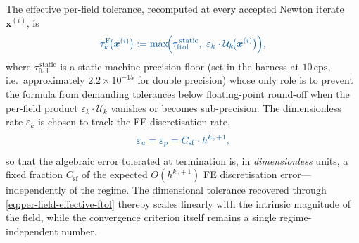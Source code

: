 \documentclass{article}
\newcommand{\textftol}{\tau_{\mathrm{ftol}}}
\newcommand{\extline}[1]{{\color{extcolor}#1}}
\begin{document}
\extline{The effective per-field tolerance, recomputed at every
accepted Newton iterate $\boldsymbol{x}^{(i)}$, is}
\begin{equation}
    \label{eq:per-field-effective-ftol}
    \textcolor{extcolor}{
    \tau^{\mathrm{F}}_{k}\!\bigl(\boldsymbol{x}^{(i)}\bigr)
    := \max\!\Bigl(\textftol^{\,\mathrm{static}},\
        \varepsilon_{k} \cdot \mathcal{U}_{k}\!\bigl(\boldsymbol{x}^{(i)}\bigr)\Bigr),}
\end{equation}
\extline{where $\textftol^{\,\mathrm{static}}$ is a static
machine-precision floor (set in the harness at $10\,\mathrm{eps}$,
i.e.\ approximately $2.2\times 10^{-15}$ for double precision) whose
only role is to prevent the formula from demanding tolerances below
floating-point round-off when the per-field product
$\varepsilon_{k}\cdot \mathcal{U}_{k}$ vanishes or becomes
sub-precision. The dimensionless rate $\varepsilon_{k}$ is chosen to track
the FE discretisation rate,}
\begin{equation}
    \label{eq:per-field-rate}
    \textcolor{extcolor}{
    \varepsilon_{u} = \varepsilon_{p} = C_{\mathrm{sf}} \cdot h^{k_{v}+1},}
\end{equation}
\extline{so that the algebraic error tolerated at termination is, in
\emph{dimensionless} units, a fixed fraction $C_{\mathrm{sf}}$ of the
expected $O(h^{k_{v}+1})$ FE discretisation error---independently of
the regime. The dimensional tolerance recovered through
\eqref{eq:per-field-effective-ftol} thereby scales linearly with the
intrinsic magnitude of the field, while the convergence criterion
itself remains a single regime-independent number.}
\end{document}

